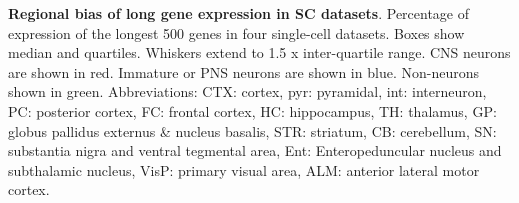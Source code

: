 \textbf{Regional bias of long gene expression in SC datasets}. Percentage of expression of the longest 500 genes in four single-cell datasets. Boxes show median and quartiles. Whiskers extend to 1.5 x inter-quartile range. CNS neurons are shown in red. Immature or PNS neurons are shown in blue. Non-neurons shown in green. Abbreviations: CTX: cortex, pyr: pyramidal, int: interneuron, PC: posterior cortex, FC: frontal cortex, HC: hippocampus, TH: thalamus, GP: globus pallidus externus \& nucleus basalis, STR: striatum, CB: cerebellum, SN: substantia nigra and ventral tegmental area, Ent: Enteropeduncular nucleus and subthalamic nucleus, VisP: primary visual area, ALM: anterior lateral motor cortex.

